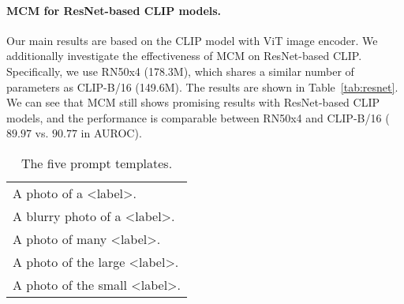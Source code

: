 \documentclass{article}
\begin{document}
\paragraph{MCM for ResNet-based CLIP models.}
Our main results are based on the CLIP model with ViT image encoder. We additionally investigate the effectiveness of MCM on ResNet-based CLIP. Specifically, we use RN50x4 (178.3M), which shares a similar number of parameters as CLIP-B/16 (149.6M). The results are shown in Table~\ref{tab:resnet}.
We can see that MCM still shows promising results with ResNet-based CLIP models, and the performance is comparable between RN50x4 and CLIP-B/16  ($89.97$ vs. $90.77$ in AUROC).
\begin{table}[hbt]
\caption{Comparison with ResNet-based CLIP models on ImageNet-1k (ID).}
\label{tab:resnet}
\centering
{}
\end{table}



\begin{wraptable}{r}{5cm}
\small
\vspace{-3mm}
\begin{tabular}{l}
\toprule
A photo of a <label>.\\
A blurry photo of a <label>.\\
A photo of many <label>.\\
A photo of the large <label>.\\
A photo of the small <label>.\\
\bottomrule
\end{tabular}
\caption{The five prompt templates.}
\label{tab:prompt}
\vspace{-3mm}
\end{wraptable}
\end{document}
